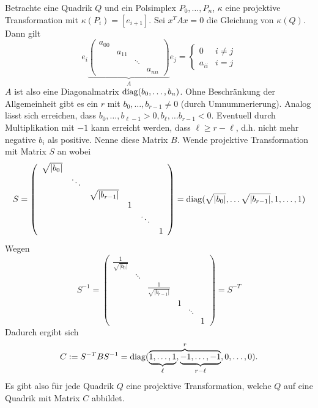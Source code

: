 \documentclass[11pt]{article}
\begin{document}
\begin{remark}\label{rem:rank}
Betrachte eine Quadrik $Q$ und ein Polsimplex $P_0, \dots, P_n$, $\kappa$ eine projektive Transformation mit $\kappa(P_i) = [e_{i+1}]$. Sei $x^TAx = 0$ die Gleichung von $\kappa(Q)$. Dann gilt \begin{equation*}
    e_i\underbrace{\left(\begin{array}{cccc}
         a_{00}&  \\
         &a_{11}&\\
         &&\ddots\\
         &&&a_{nn}
    \end{array}\right)}_A e_j = \left\{\begin{array}{cc}
        0  &i\neq j\\
        a_{ii}&i=j 
    \end{array}\right.
\end{equation*}
$A$ ist also eine Diagonalmatrix $\mathrm{diag} (b_0,\dots, b_n)$. Ohne Beschränkung der Allgemeinheit gibt es ein $r$ mit $b_0,\dots, b_{r-1}\neq 0$ (durch Umnummerierung). Analog lässt sich erreichen, dass $b_0,\dots, b_{\ell-1}>0, b_\ell,\dots b_{r-1}<0$. Eventuell durch Multiplikation mit $-1$ kann erreicht werden, dass $\ell \geq r-\ell$, d.h. nicht mehr negative $b_i$ als positive. Nenne diese Matrix $B$. Wende projektive Transformation mit Matrix $S$ an wobei \begin{equation*}
    S = \left(\begin{array}{cccccc}
         \sqrt{|b_0|}&  \\
         &\ddots\\
         &&\sqrt{|b_{r-1}|}\\
         &&&1\\
         &&&&\ddots\\
         &&&&&1
    \end{array}\right) = \mathrm{diag} (\sqrt{|b_0|}, \dots \sqrt{|b_{r-1}|}, 1,\dots, 1)
\end{equation*}
Wegen \begin{equation*}
    S^{-1} = \left(\begin{array}{cccccc}
         \frac1{\sqrt{|b_0|}}&  \\
         &\ddots\\
         &&\frac1{\sqrt{|b_{r-1}|}}\\
         &&&1\\
         &&&&\ddots\\
         &&&&&1
    \end{array}\right) = S^{-T}
\end{equation*}
Dadurch ergibt sich \begin{equation*}
    C:=S^{-T}BS^{-1} = \mathrm{diag} (\overbrace{\underbrace{1,\dots, 1}_\ell, \underbrace{-1,\dots, -1}_{r-\ell}}^r, 0,\dots, 0).
\end{equation*}
Es gibt also für jede Quadrik $Q$ eine projektive Transformation, welche $Q$ auf eine Quadrik mit Matrix $C$ abbildet.
\end{remark}
\end{document}
